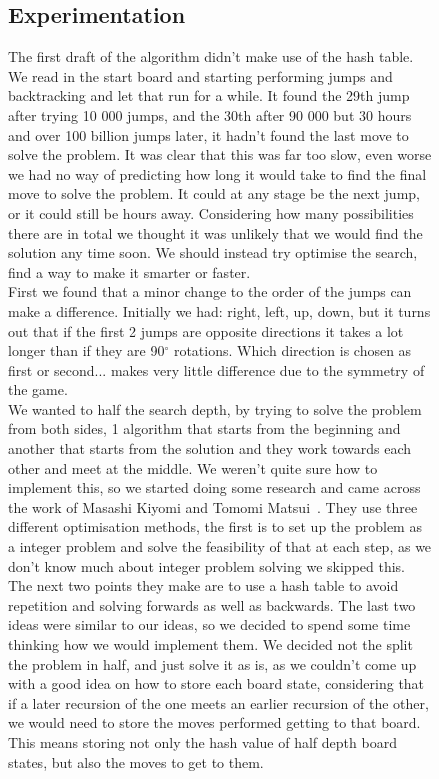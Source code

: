 \documentclass[11pt]{article}
\begin{document}
\begin{figure}
\subsection{Experimentation}
The first draft of the algorithm didn't make use of the hash table. We read in the start board and starting performing jumps and backtracking and let that run for a while.
It found the 29th jump after trying 10 000 jumps, and the 30th after 90 000 but 30 hours and over 100 billion jumps later, it hadn't found the last move to solve the problem.\newline
It was clear that this was far too slow, even worse we had no way of predicting how long it would take to find the final move to solve the problem. It could at any stage be the next jump, or it could still be hours away. Considering how many possibilities there are in total we thought it was unlikely that we would find the solution any time soon. We should instead try optimise the search, find a way to make it smarter or faster.\\
First we found that a minor change to the order of the jumps can make a difference. Initially we had: right, left, up, down, but it turns out that if the first 2 jumps are opposite directions it takes a lot longer than if they are 90$^{\circ}$ rotations. Which direction is chosen as first or second... makes very little difference due to the symmetry of the game.\\
We wanted to half the search depth, by trying to solve the problem from both sides, 1 algorithm that starts from the beginning and another that starts from the solution and they work towards each other and meet at the middle.
We weren't quite sure how to implement this, so we started doing some research and came across the work of Masashi Kiyomi and Tomomi Matsui~\cite{Tomomi}.
They use three different optimisation methods, the first is to set up the problem as a integer problem and solve the feasibility of that at each step, as we don't know much about integer problem solving we skipped this.\newline
The next two points they make are to use a hash table to avoid repetition and solving forwards as well as backwards. The last two ideas were similar to our ideas, so we decided to spend some time thinking how we would implement them.\newline
We decided not the split the problem in half, and just solve it as is, as we couldn't come up with a good idea on how to store each board state, considering that if a later recursion of the one meets an earlier recursion of the other, we would need to store the moves performed getting to that board. This means storing not only the hash value of half depth board states, but also the moves to get to them.

\end{figure}
\end{document}
